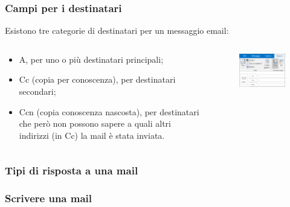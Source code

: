 \documentclass[handout]{beamer}
\begin{document}
\begin{frame}
\frametitle{Campi per i destinatari}
Esistono tre categorie di destinatari per un messaggio email:
\begin{columns}
  \begin{column}{0.5\textwidth}
  \begin{itemize}
   \item \alert<1>{A}, per uno o più destinatari principali;\pause
   \item \alert<2>{Cc} (copia per conoscenza), per destinatari secondari;\pause
   \item \alert<3>{Ccn} (copia conoscenza nascosta), per destinatari che però non possono sapere a quali altri indirizzi (in Cc) la mail è stata inviata.
  \end{itemize}
  \end{column}
  \begin{column}{0.4\textwidth}
  \begin{figure}
  \includegraphics[width=\columnwidth]{img/accccn.png}
  \end{figure}
  \end{column}
\end{columns}
\end{frame}





\begin{frame}
\frametitle{Tipi di risposta a una mail}

\end{frame}



\begin{frame}
\frametitle{Scrivere una mail}

\end{frame}
\end{document}
